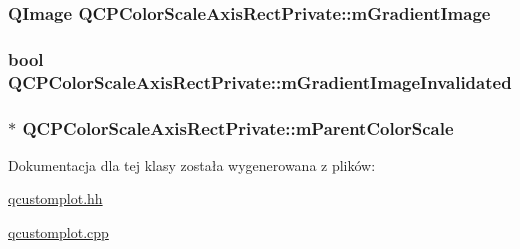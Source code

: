 \subsubsection[{\texorpdfstring{m\+Gradient\+Image}{mGradientImage}}]{\setlength{\rightskip}{0pt plus 5cm}Q\+Image Q\+C\+P\+Color\+Scale\+Axis\+Rect\+Private\+::m\+Gradient\+Image\hspace{0.3cm}{\ttfamily [protected]}}\hypertarget{class_q_c_p_color_scale_axis_rect_private_ad4f7c8ee1c6012d9950870811773119c}{}\label{class_q_c_p_color_scale_axis_rect_private_ad4f7c8ee1c6012d9950870811773119c}
\subsubsection[{\texorpdfstring{m\+Gradient\+Image\+Invalidated}{mGradientImageInvalidated}}]{\setlength{\rightskip}{0pt plus 5cm}bool Q\+C\+P\+Color\+Scale\+Axis\+Rect\+Private\+::m\+Gradient\+Image\+Invalidated\hspace{0.3cm}{\ttfamily [protected]}}\hypertarget{class_q_c_p_color_scale_axis_rect_private_a2c0b15b071e1f93006b48b5be022a631}{}\label{class_q_c_p_color_scale_axis_rect_private_a2c0b15b071e1f93006b48b5be022a631}
\subsubsection[{\texorpdfstring{m\+Parent\+Color\+Scale}{mParentColorScale}}]{$\ast$ Q\+C\+P\+Color\+Scale\+Axis\+Rect\+Private\+::m\+Parent\+Color\+Scale\hspace{0.3cm}{\ttfamily [protected]}}\hypertarget{class_q_c_p_color_scale_axis_rect_private_a311c73f51a4cb0b556388197833cf099}{}\label{class_q_c_p_color_scale_axis_rect_private_a311c73f51a4cb0b556388197833cf099}


Dokumentacja dla tej klasy została wygenerowana z plików\+:\begin{DoxyCompactItemize}
\item 
\hyperlink{qcustomplot_8hh}{qcustomplot.\+hh}\item 
\hyperlink{qcustomplot_8cpp}{qcustomplot.\+cpp}\end{DoxyCompactItemize}

